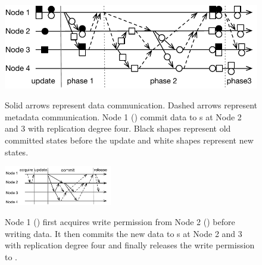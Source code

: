 {
\begin{figure}[th]
\begin{minipage}{\columnwidth}
\begin{center}
\centerline{\includegraphics[width=\columnwidth]{Figures/commit.pdf}}
\vspace{-0.05in}
{
Solid arrows represent data communication.
Dashed arrows represent metadata communication.
Node 1 (\xn) commit data to \on{}s at Node 2 and 3 with replication degree four.
Black shapes represent old committed states before the update
and white shapes represent new states.
}
\end{center}
\end{minipage}
\begin{minipage}{\columnsep}
\end{minipage}
\begin{minipage}{\columnwidth}
\begin{center}
\centerline{\includegraphics[width=0.42\textwidth]{Figures/mrsw.pdf}}
\vspace{-0.05in}
{
Node 1 (\xn) first acquires write permission from Node 2 (\master)
before writing data.
It then commits the new data to \on{}s at Node 2 and 3 with replication degree four
and finally releases the write permission to \master.
}
\end{center}
\end{minipage}
\vspace{-0.3in}
\end{figure}
}
